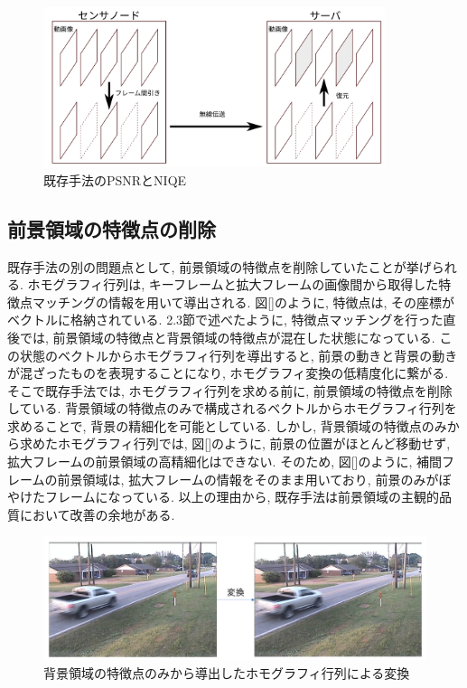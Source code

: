 \documentclass[a4paper,12pt]{jsreport}
\begin{document}
\begin{figure}[h]
  \begin{center}
    \includegraphics[width=10cm]{./frame_reduction.png}
    \caption{既存手法のPSNRとNIQE}
  \end{center}
\end{figure}


\subsection{前景領域の特徴点の削除}
既存手法の別の問題点として, 前景領域の特徴点を削除していたことが挙げられる. 
ホモグラフィ行列は, キーフレームと拡大フレームの画像間から取得した特徴点マッチングの情報を用いて導出される. 図[]のように, 特徴点は, その座標がベクトルに格納されている. 2.3節で述べたように, 特徴点マッチングを行った直後では, 前景領域の特徴点と背景領域の特徴点が混在した状態になっている. この状態のベクトルからホモグラフィ行列を導出すると, 前景の動きと背景の動きが混ざったものを表現することになり, ホモグラフィ変換の低精度化に繋がる. 
そこで既存手法では, ホモグラフィ行列を求める前に, 前景領域の特徴点を削除している. 背景領域の特徴点のみで構成されるベクトルからホモグラフィ行列を求めることで, 背景の精細化を可能としている. しかし, 背景領域の特徴点のみから求めたホモグラフィ行列では, 図[]のように, 前景の位置がほとんど移動せず, 拡大フレームの前景領域の高精細化はできない. そのため, 図[]のように, 補間フレームの前景領域は, 拡大フレームの情報をそのまま用いており, 前景のみがぼやけたフレームになっている. 
以上の理由から, 既存手法は前景領域の主観的品質において改善の余地がある. 


\begin{figure}[h]
  \begin{center}
    \includegraphics[width=13cm]{./problem_2}
    \caption{背景領域の特徴点のみから導出したホモグラフィ行列による変換}
  \end{center}
\end{figure}
\end{document}
